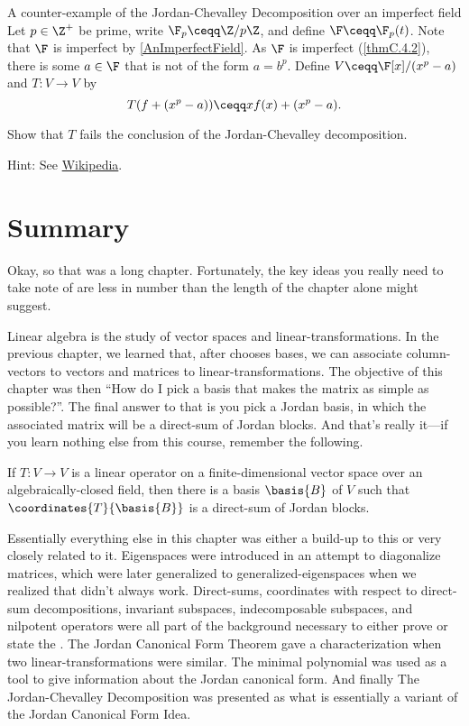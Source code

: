 \begin{exm}{A counter-example of the Jordan-Chevalley Decomposition over an imperfect field}{}
	Let $p\in \Z ^+$ be prime, write $\F _p\ceqq \Z /p\Z$, and define $\F \ceqq \F _p(t)$.  Note that $\F$ is imperfect by \cref{AnImperfectField}.  As $\F$ is imperfect (\cref{thmC.4.2}), there is some $a\in \F$ that is not of the form $a=b^p$.  Define $V\ceqq \F [x]/(x^p-a)$ and $T\colon V\rightarrow V$ by
	\begin{equation}
		T(f+(x^p-a))\ceqq xf(x)+(x^p-a).
	\end{equation}
	\begin{exr}[breakable=false]{}{}
		Show that $T$ fails the conclusion of the Jordan-Chevalley decomposition.
		\begin{rmk}
			Hint:  See \href{https://www.wikiwand.com/en/Jordan\%E2\%80\%93Chevalley_decomposition#/Counterexample}{Wikipedia}.
		\end{rmk}
	\end{exr}
\end{exm}

\section{Summary}

Okay, so that was a long chapter.  Fortunately, the key ideas you really need to take note of are less in number than the length of the chapter alone might suggest.

Linear algebra is the study of vector spaces and linear-transformations.  In the previous chapter, we learned that, after chooses bases, we can associate column-vectors to vectors and matrices to linear-transformations.  The objective of this chapter was then ``How do I pick a basis that makes the matrix as simple as possible?''.  The final answer to that is you pick a Jordan basis, in which the associated matrix will be a direct-sum of Jordan blocks.  And that's really it---if you learn nothing else from this course, remember the following.
\begin{displayquote}
	If $T\colon V\rightarrow V$ is a linear operator on a finite-dimensional vector space over an algebraically-closed field, then there is a basis $\basis{B}$ of $V$ such that $\coordinates{T}{\basis{B}}$ is a direct-sum of Jordan blocks.
\end{displayquote}

Essentially everything else in this chapter was either a build-up to this or very closely related to it.  Eigenspaces were introduced in an attempt to diagonalize matrices, which were later generalized to generalized-eigenspaces when we realized that didn't always work.  Direct-sums, coordinates with respect to direct-sum decompositions, invariant subspaces, indecomposable subspaces, and nilpotent operators were all part of the background necessary to either prove or state the .  The Jordan Canonical Form Theorem gave a characterization when two linear-transformations were similar.  The minimal polynomial was used as a tool to give information about the Jordan canonical form.  And finally The Jordan-Chevalley Decomposition was presented as what is essentially a variant of the Jordan Canonical Form Idea.

